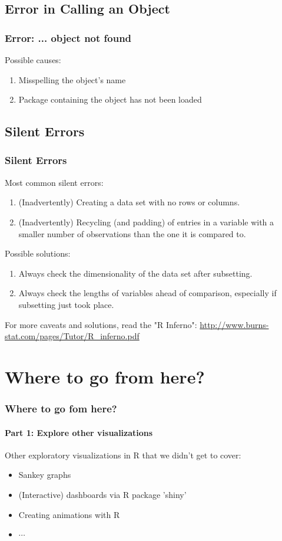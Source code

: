 \subsection{Error in Calling an Object}
\begin{frame}[fragile]
  \frametitle{\ttfamily Error: ... object not found \normalfont}
Possible causes:
  \begin{enumerate}
    \item Misspelling the object's name
    \item Package containing the object has not been loaded
  \end{enumerate}
  
\end{frame}

\subsection{Silent Errors}
\begin{frame}[fragile]
  \frametitle{Silent Errors}
Most common silent errors:
  \begin{enumerate}
    \item (Inadvertently) Creating a data set with no rows or columns. 
    \item (Inadvertently) Recycling (and padding) of entries in a variable with a smaller number of observations than the one it is compared to.  
  \end{enumerate}
Possible solutions:
  \begin{enumerate}
    \item Always check the dimensionality of the data set after subsetting.
    \item Always check the lengths of variables ahead of comparison, especially if subsetting just took place.
  \end{enumerate}   
\noindent For more caveats and solutions, read the "R Inferno": \url{http://www.burns-stat.com/pages/Tutor/R_inferno.pdf}
  
\end{frame}

\section[Next Steps]{Where to go from here?}
\begin{frame}
  \frametitle{Where to go fom here?}
  \framesubtitle{Part 1: Explore other visualizations}

  Other exploratory visualizations in R that we didn't get to cover:
  \begin{itemize}
    \item Sankey graphs
    \item (Interactive) dashboards via R package 'shiny'   
    \item Creating animations with R
    \item $\cdots$
  \end{itemize}
\end{frame}

